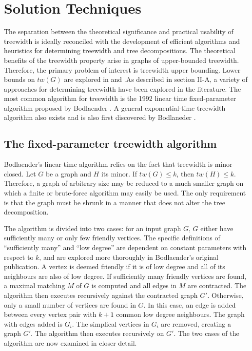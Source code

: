 \documentclass[12pt,conference]{IEEEtran}
\theoremstyle{plain}
\begin{document}
\section{Solution Techniques}

The separation between the theoretical significance and practical usability of treewidth is ideally reconciled with the development of efficient algorithms and heuristics for determining treewidth and tree decompositions. The theoretical benefits of the treewidth property arise in graphs of upper-bounded treewidth. Therefore, the primary problem of interest is treewidth upper bounding. Lower bounds on $tw(G)$ are explored in \cite{treewidth-lowerbounds-1} and \cite{treewidth-lowerbounds-2}.As described in section II-A, a variety of approaches for determining treewidth have been explored in the literature. The most common algorithm for treewidth is the 1992 linear time fixed-parameter algorithm proposed by Bodlaender \cite{bodlaender-1992}. A general exponential-time treewidth algorithm also exists and is also first discovered by Bodlaneder \cite{bodlaender-2012}.

\subsection{The fixed-parameter treewidth algorithm}

Bodlaender's linear-time algorithm relies on the fact that treewidth is minor-closed. Let $G$ be a graph and $H$ its minor. If $tw(G) \leq k$, then $tw(H) \leq k$. Therefore, a graph of arbitrary size may be reduced to a much smaller graph on which a finite or brute-force algorithm may easily be used. The only requirement is that the graph must be shrunk in a manner that does not alter the tree decomposition. 

The algorithm is divided into two cases: for an input graph $G$, $G$ either have sufficiently many or only few friendly vertices. The specific definitions of ``sufficiently many'' and ``low degree'' are dependent on constant parameters with respect to $k$, and are explored more thoroughly in Bodlaender's original publication. A vertex is deemed friendly if it is of low degree and all of its neighbours are also of low degree. If sufficiently many friendly vertices are found, a maximal matching $M$ of $G$ is computed and all edges in $M$ are contracted. The algorithm then executes recursively against the contracted graph $G'$. Otherwise, only a small number of vertices are found in $G$. In this case, an edge is added between every vertex pair with $k+1$ common low degree neighbours. The graph with edges added is $G_{i}$. The simplical vertices in $G_{i}$ are removed, creating a graph $G'$. The algorithm then executes recursively on $G'$. The two cases of the algorithm are now examined in closer detail.
\end{document}

